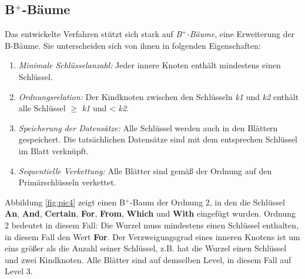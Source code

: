 \subsection{B$^+$-Bäume}\label{sec:b+bäume}
Das entwickelte Verfahren stützt sich stark auf \textit{B$^+$-Bäume}, eine Erweiterung der B-Bäume. Sie unterscheiden sich von ihnen in folgenden Eigenschaften: 
\newpage
\begin{enumerate}
\setlength{\itemsep}{20pt}
	\item \textit{Minimale Schlüsselanzahl:} Jeder innere Knoten enthält mindestens einen Schlüssel.  
	\item \textit{Ordnungsrelation:} Der Kindknoten zwischen den Schlüsseln \textit{k1} und \textit{k2} enthält alle Schlüssel $\geq$ \textit{k1} und < \textit{k2}.
	\item \textit{Speicherung der Datensätze:} Alle Schlüssel werden auch in den Blättern gespeichert. Die tatsächlichen Datensätze sind mit dem entsprechen Schlüssel im Blatt verknüpft. 
	\item \textit{Sequentielle Verkettung:} Alle Blätter sind gemäß der Ordnung auf den Primärschlüsseln verkettet. 
\end{enumerate}
Abbildung \ref{fig:pic4} zeigt einen B$^+$-Baum der Ordnung 2, in den die Schlüssel \textbf{An}, \textbf{And}, \textbf{Certain}, \textbf{For}, \textbf{From}, \textbf{Which} und \textbf{With} eingefügt wurden. Ordnung 2 bedeutet in diesem Fall: Die Wurzel muss mindestens einen Schlüssel enthalten, in diesem Fall den Wert \textbf{For}. Der Verzweigungsgrad eines inneren Knotens ist um eins größer als die Anzahl seiner Schlüssel, z.B. hat die Wurzel einen Schlüssel und zwei Kindknoten. Alle Blätter sind auf demselben Level, in diesem Fall auf Level 3.

